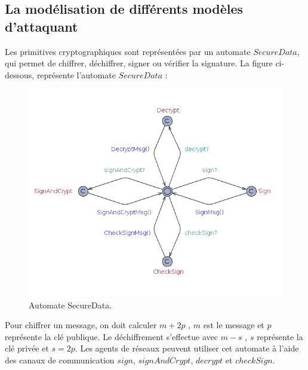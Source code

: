 \documentclass[10pt,a4paper]{article}
\begin{document}
\subsection{La modélisation de différents modèles d'attaquant}
Les primitives cryptographiques sont représentées par un automate $SecureData$, qui permet de chiffrer, déchiffrer, signer ou vérifier la signature. La figure ci-dessous, représente l'automate $SecureData$ :
\begin{figure}[!h]
\begin{center}
\includegraphics[scale=0.3]{img/secureData.png}\newline
\caption{Automate SecureData.}
\end{center}
\end{figure}

Pour chiffrer un message, on doit calculer $m+2p$ , $m$ est le message et $p$ représente la clé publique. Le déchiffrement s'effectue avec $m-s$ , $s$ représente la clé privée et $s=2p$. Les agents de réseaux peuvent utiliser cet automate à l'aide des canaux de communication $sign$, $signAndCrypt$, $decrypt$ et $checkSign$.
\end{document}
